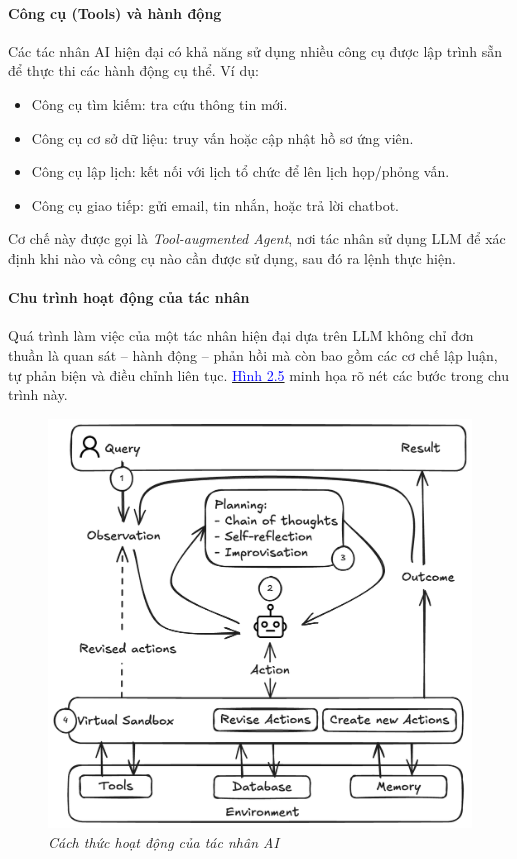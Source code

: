 \documentclass{article}
\begin{document}
\paragraph{Công cụ (Tools) và hành động}
Các tác nhân AI hiện đại có khả năng sử dụng nhiều công cụ được lập trình sẵn để thực thi các hành động cụ thể. Ví dụ:
\begin{itemize}[topsep=0pt, itemsep=0pt, leftmargin=40pt]
    \item Công cụ tìm kiếm: tra cứu thông tin mới.
    \item Công cụ cơ sở dữ liệu: truy vấn hoặc cập nhật hồ sơ ứng viên.
    \item Công cụ lập lịch: kết nối với lịch tổ chức để lên lịch họp/phỏng vấn.
    \item Công cụ giao tiếp: gửi email, tin nhắn, hoặc trả lời chatbot.
\end{itemize}

Cơ chế này được gọi là \textit{Tool-augmented Agent}, nơi tác nhân sử dụng LLM để xác định khi nào và công cụ nào cần được sử dụng, sau đó ra lệnh thực hiện.

\paragraph{Chu trình hoạt động của tác nhân}
Quá trình làm việc của một tác nhân hiện đại dựa trên LLM không chỉ đơn thuần là quan sát – hành động – phản hồi mà còn bao gồm các cơ chế lập luận, tự phản biện và điều chỉnh liên tục. \hyperref[fig:agent-workflow]{\textcolor{blue}{Hình 2.5}} minh họa rõ nét các bước trong chu trình này.

\begin{figure}[H]
    \centering
    \includegraphics[width=0.8\linewidth]{img/agent-workflow.png}
    \caption{\centering \textit{Cách thức hoạt động của tác nhân AI}}
    \label{fig:agent-workflow}
\end{figure}
\end{document}
